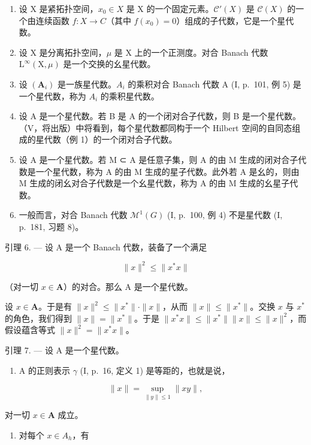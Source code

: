 \begin{enumerate}
\def\labelenumi{\arabic{enumi})}
\setcounter{enumi}{2}
\item
  设 X 是紧拓扑空间，\(x_{0} \in X\) 是 X 的一个固定元素。\(\mathcal{C}'(X)\) 是 \(\mathcal{C}(X)\) 的一个由连续函数 \(f: X \to C\)（其中 \(f(x_{0}) = 0\)）组成的子代数，它是一个星代数。
\item
  设 X 是分离拓扑空间，\(\mu\) 是 X 上的一个正测度。对合 Banach 代数 \(\mathrm{L}^{\infty}(\mathrm{X},\mu)\) 是一个交换的幺星代数。
\item
  设 \((\mathbf{A}_{i})\) 是一族星代数。\(A_{i}\) 的乘积对合 Banach 代数 A (I, p.~101, 例 5) 是一个星代数，称为 \(A_{i}\) 的乘积星代数。
\item
  设 A 是一个星代数。若 B 是 A 的一个闭对合子代数，则 B 是一个星代数。（V，将出版）中将看到，每个星代数都同构于一个 Hilbert 空间的自同态组成的星代数（例 1）的一个闭对合子代数。
\item
  设 A 是一个星代数。若 M ⊂ A 是任意子集，则 A 的由 M 生成的闭对合子代数是一个星代数，称为 A 的由 M 生成的星子代数。此外若 A 是幺的，则由 M 生成的闭幺对合子代数是一个幺星代数，称为 A 的由 M 生成的幺星子代数。
\item
  一般而言，对合 Banach 代数 \(\mathcal{M}^{1}(G)\) (I, p.~100, 例 4) 不是星代数 (I, p.~181, 习题 8)。
\end{enumerate}

引理 6. --- 设 A 是一个 Banach 代数，装备了一个满足

\[
\| x \| ^ {2} \leqslant \| x ^ {*} x \|\tag{1}
\]

（对一切 \(x \in \mathbf{A}\)）的对合。那么 A 是一个星代数。

设 \(x \in \mathbf{A}\)。于是有 \(\|x\|^2 \leqslant \|x^*\| \cdot \|x\|\)，从而 \(\|x\| \leqslant \|x^*\|\)。交换 \(x\) 与 \(x^*\) 的角色，我们得到 \(\|x\| = \|x^*\|\)。于是 \(\|x^*x\| \leqslant \|x^*\|\|x\| \leqslant \|x\|^2\)，而假设蕴含等式 \(\|x\|^2 = \|x^*x\|\)。

引理 7. --- 设 A 是一个星代数。

\begin{enumerate}
\def\labelenumi{\alph{enumi})}
\tightlist
\item
  A 的正则表示 \(\gamma\) (I, p.~16, 定义 1) 是等距的，也就是说，
\end{enumerate}

\[
\| x \| = \sup _ {\| y \| \leqslant 1} \| x y \|,
\]

对一切 \(x\in \mathbf{A}\) 成立。

\begin{enumerate}
\def\labelenumi{\alph{enumi})}
\setcounter{enumi}{1}
\tightlist
\item
  对每个 \(x \in A_{h}\)，有
\end{enumerate}

